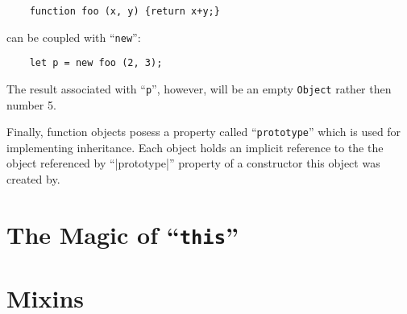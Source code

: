 \documentclass{article}
\begin{document}
\begin{lstlisting}
    function foo (x, y) {return x+y;}
\end{lstlisting}

can be coupled with ``\lstinline|new|'':

\begin{lstlisting}
    let p = new foo (2, 3);
\end{lstlisting}

The result associated with ``\lstinline|p|'', however, will be an empty \lstinline|Object| rather then number 5.

Finally, function objects posess a property called ``\lstinline|prototype|'' which is used for implementing
inheritance. Each object holds an implicit reference to the the object referenced by ``\lstinlie|prototype|''
property of a constructor this object was created by. 


\section{The Magic of ``\lstinline[basicstyle=\normal]|this|''}
\label{sec:this}

\section{Mixins}
\end{document}

